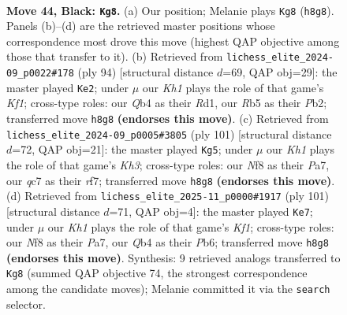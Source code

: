 \documentclass[11pt]{article}
\begin{document}
\clearpage

\begin{figure}[p]\centering
\begin{subfigure}{0.46\textwidth}\centering
\resizebox{\linewidth}{!}{%
\newchessgame
\chessboard[
  setfen={5n1k/1pQ4p/8/1r5p/1q6/6NK/R7/7R b - - 1 44},
  showmover=false,
  pgfstyle=straightmove, color=movearrow, markmove={h8-g8}
]}
\caption{}
\end{subfigure}\hfill
\begin{subfigure}{0.46\textwidth}\centering
\resizebox{\linewidth}{!}{%
\newchessgame
\chessboard[
  setfen={6r1/7k/p6p/Q3Nb2/3P4/5Pq1/PP6/3R1K2 w - - 2 48},
  showmover=false,
  pgfstyle=straightmove, color=movearrow, markmove={f1-e2}
]}
\caption{}
\end{subfigure}
\\[4pt]
\begin{subfigure}{0.46\textwidth}\centering
\resizebox{\linewidth}{!}{%
\newchessgame
\chessboard[
  setfen={5N2/pp3R2/1r4pk/5p2/8/7P/5K2/8 b - - 4 51},
  showmover=false,
  pgfstyle=straightmove, color=movearrow, markmove={h6-g5}
]}
\caption{}
\end{subfigure}\hfill
\begin{subfigure}{0.46\textwidth}\centering
\resizebox{\linewidth}{!}{%
\newchessgame
\chessboard[
  setfen={5k2/p4r2/1p5Q/8/P2qp3/7P/7N/5B1K b - - 3 51},
  showmover=false,
  pgfstyle=straightmove, color=movearrow, markmove={f8-e7}
]}
\caption{}
\end{subfigure}
\caption{\textbf{Move 44, Black: \texttt{Kg8}.} (a) Our position; Melanie plays \texttt{Kg8} (\texttt{h8g8}). Panels (b)--(d) are the retrieved master positions whose correspondence most drove this move (highest QAP objective among those that transfer to it). (b) Retrieved from \texttt{lichess\_elite\_2024-09\_p0022\#178} (ply 94) [structural distance $d$=69, QAP obj=29]: the master played \texttt{Ke2}; under $\mu$ our \emph{Kh1} plays the role of that game's \emph{Kf1}; cross-type roles: our \emph{Q}b4 as their \emph{R}d1, our \emph{R}b5 as their \emph{P}b2; transferred move \texttt{h8g8} \textbf{(endorses this move)}. (c) Retrieved from \texttt{lichess\_elite\_2024-09\_p0005\#3805} (ply 101) [structural distance $d$=72, QAP obj=21]: the master played \texttt{Kg5}; under $\mu$ our \emph{Kh1} plays the role of that game's \emph{Kh3}; cross-type roles: our \emph{N}f8 as their \emph{P}a7, our \emph{q}c7 as their \emph{r}f7; transferred move \texttt{h8g8} \textbf{(endorses this move)}. (d) Retrieved from \texttt{lichess\_elite\_2025-11\_p0000\#1917} (ply 101) [structural distance $d$=71, QAP obj=4]: the master played \texttt{Ke7}; under $\mu$ our \emph{Kh1} plays the role of that game's \emph{Kf1}; cross-type roles: our \emph{N}f8 as their \emph{P}a7, our \emph{Q}b4 as their \emph{P}b6; transferred move \texttt{h8g8} \textbf{(endorses this move)}. Synthesis: 9 retrieved analogs transferred to \texttt{Kg8} (summed QAP objective 74, the strongest correspondence among the candidate moves); Melanie committed it via the \texttt{search} selector.}
\label{fig:thought-m87}
\end{figure}
\end{document}
